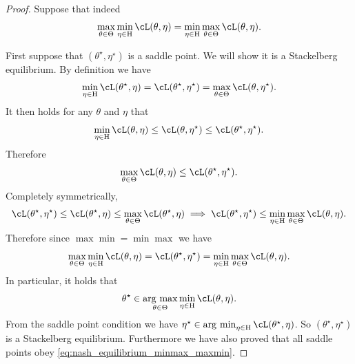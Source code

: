 \documentclass[../../book-main.tex]{subfiles}
\begin{document}
\begin{proof} 
    Suppose that indeed 
    \begin{equation}
        \max_{\theta \in \Theta}\min_{\eta \in \Eta}\cL(\theta, \eta) = \min_{\eta \in \Eta}\max_{\theta  \in \Theta}\cL(\theta, \eta).
    \end{equation}

    First suppose that \((\theta^{\star}, \eta^{\star})\) is a saddle point. We will show it is a Stackelberg equilibrium. By definition we have 
    \begin{equation}
        \min_{\eta \in \Eta}\cL(\theta^{\star}, \eta) = \cL(\theta^{\star}, \eta^{\star}) = \max_{\theta \in \Theta}\cL(\theta, \eta^{\star}).
    \end{equation}
    It then holds for any \(\theta\) and \(\eta\) that 
    \begin{equation}
        \min_{\eta \in \Eta}\cL(\theta, \eta) \leq \cL(\theta, \eta^{\star}) \leq \cL(\theta^{\star}, \eta^{\star}).
    \end{equation}
    Therefore
    \begin{equation}
        \max_{\theta \in \Theta}\cL(\theta, \eta) \leq \cL(\theta^{\star}, \eta^{\star}).
    \end{equation}
    Completely symmetrically, 
    \begin{equation}
        \cL(\theta^{\star}, \eta^{\star}) \leq \cL(\theta^{\star}, \eta) \leq \max_{\theta \in \Theta}\cL(\theta^{\star}, \eta) \implies \cL(\theta^{\star}, \eta^{\star}) \leq \min_{\eta \in \Eta}\max_{\theta \in \Theta}\cL(\theta, \eta).
    \end{equation}
    Therefore since \(\max\min = \min\max\) we have 
    \begin{equation}\label{eq:nash_equilibrium_minmax_maxmin}
        \max_{\theta \in \Theta}\min_{\eta \in \Eta}\cL(\theta, \eta) = \cL(\theta^{\star}, \eta^{\star}) = \min_{\eta \in \Eta}\max_{\theta \in \Theta}\cL(\theta, \eta).
    \end{equation}
    In particular, it holds that
    \begin{equation}
        \theta^{\star} \in \argmax_{\theta \in \Theta}\min_{\eta \in \Eta}\cL(\theta, \eta).
    \end{equation}
    From the saddle point condition we have \(\eta^{\star} \in \argmin_{\eta \in \Eta}\cL(\theta^{\star}, \eta)\). So \((\theta^{\star}, \eta^{\star})\) is a Stackelberg equilibrium. Furthermore we have also proved that all saddle points obey \eqref{eq:nash_equilibrium_minmax_maxmin}.


\end{proof}
\end{document}
